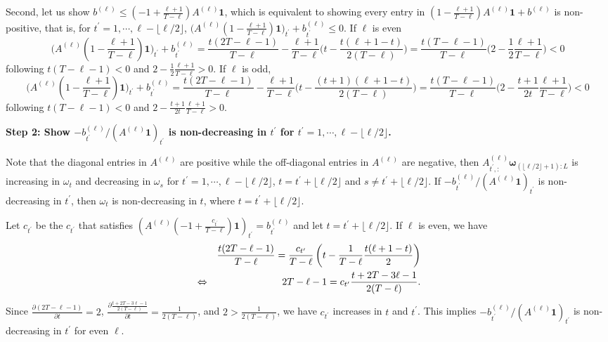 				Second, let us show $ b^{(\ell)} \leq (-1 + \frac{\ell+1}{T - \ell}) A^{(\ell)}  \bm{1}$, which is equivalent to showing every entry in $ (1 - \frac{\ell+1}{T - \ell}) A^{(\ell)}  \bm{1} + b^{(\ell)} $ is non-positive, that is, for $t^\prime = 1, \cdots, \ell - \lfloor \ell/2 \rfloor$, $\big( A^{(\ell)} (1-\frac{\ell+1}{T - \ell}) \bm{1} \big)_{t^\prime} +  b^{(\ell)}_{t^\prime} \leq 0$. 
				If $\ell$ is even
				\[ \Big( A^{(\ell)} (1-\frac{\ell+1}{T - \ell}) \bm{1} \Big)_{t^\prime} +  b^{(\ell)}_{t^\prime} = \frac{t(2T - \ell-1)}{T - \ell} - \frac{\ell+1}{T - \ell} \Big(t - \frac{t(\ell+1-t)}{2(T - \ell)}\Big) = \frac{t(T - \ell-1)}{T - \ell} \Big(2- \frac{1}{2}\frac{\ell+1}{T - \ell}\Big) < 0 \]
				following $t(T - \ell-1) < 0$ and $2- \frac{1}{2}\frac{\ell+1}{T - \ell} > 0$. If $\ell$ is odd, 
				\[ \Big( A^{(\ell)} (1-\frac{\ell+1}{T - \ell}) \bm{1} \Big)_{t^\prime} +  b^{(\ell)}_{t^\prime} = \frac{t(2T - \ell-1)}{T - \ell} - \frac{\ell+1}{T - \ell} \Big(t - \frac{(t+1)(\ell+1-t)}{2(T - \ell)}\Big) = \frac{t(T - \ell-1)}{T - \ell} \Big(2- \frac{t+1}{2t}\frac{\ell+1}{T - \ell}\Big) < 0 \]
				following $t(T - \ell-1) < 0$ and $2- \frac{t+1}{2t}\frac{\ell+1}{T - \ell} > 0$.

			\textbf{Step 2: Show $- b^{(\ell)}_{t^\prime}/ (A^{(\ell)} \bm{1})_{t^\prime}$ is non-decreasing in $t^\prime$ for $t^\prime = 1, \cdots, \ell - \lfloor \ell/2 \rfloor$. } 
   
   Note that the diagonal entries in $A^{(\ell)}$ are positive while the off-diagonal entries in $A^{(\ell)}$ are negative, then $A_{t^\prime, :}^{(\ell)} \bm{\omega}_{(\lfloor \ell/2 \rfloor+1): L}$ is increasing in $\omega_{t}$ and decreasing in $\omega_s$ for $t^\prime = 1, \cdots, \ell - \lfloor \ell/2 \rfloor$, $t = t^\prime+ \lfloor \ell/2 \rfloor$ and $s \neq t^\prime+ \lfloor \ell/2 \rfloor $. If $- b^{(\ell)}_{t^\prime}/ (A^{(\ell)} \bm{1})_{t^\prime}$ is non-decreasing in $t^\prime$, then  $\omega_t$ is non-decreasing in $t$, where $t = t^\prime+ \lfloor \ell/2 \rfloor$. 
				
				Let $c_{t^\prime}$ be the   $c_{t^\prime}$ that satisfies $(A^{(\ell)} (-1 + \frac{c_{t^\prime}}{T - \ell}) \bm{1})_{t^\prime} =  b^{(\ell)}_{t^\prime}$ and let $t = t^\prime+ \lfloor \ell/2 \rfloor$. If $\ell$ is even, we have
				\begin{eqnarray*}
					&& \frac{t(2T - \ell-1)}{T - \ell}  = \frac{c_{t^\prime}}{T - \ell} \left(  t - \frac{1}{T - \ell} \frac{t(\ell+1-t)}{2} \right) \\
					&\Leftrightarrow& 2T - \ell-1 = c_{t^\prime} \frac{t+2T-3\ell-1}{2(T - \ell)}.
				\end{eqnarray*}
				Since $\frac{\partial (2T - \ell-1)}{\partial t}= 2$, $\frac{\partial \frac{t+2T-3\ell-1}{2(T - \ell)}}{\partial t} = \frac{1}{2(T - \ell)}$, and $2 > \frac{1}{2(T - \ell)}$, we have $c_{t^\prime}$ increases in $t$ and $t^\prime$.  This implies $- b^{(\ell)}_{t^\prime}/ (A^{(\ell)} \bm{1})_{t^\prime}$ is non-decreasing in $t^\prime$ for even $\ell$. 
				
